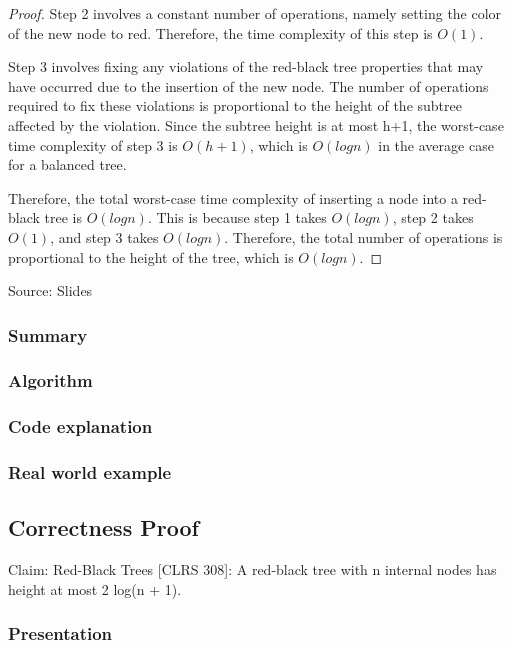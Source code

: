 \documentclass[10pt]{article}
\begin{document}
\begin{proof}
  \spacing
  \noindent
  Step 2 involves a constant number of operations, namely setting the color of
  the new node to red. Therefore, the time complexity of this step is $O(1)$.

  \spacing
  \noindent
  Step 3 involves fixing any violations of the red-black tree properties that
  may have occurred due to the insertion of the new node. The number of
  operations required to fix these violations is proportional to the height of
  the subtree affected by the violation. Since the subtree height is at most
  h+1, the worst-case time complexity of step 3 is $O(h+1)$, which is $O(log n)$
  in the average case for a balanced tree.

  \spacing
  \noindent
  Therefore, the total worst-case time complexity of inserting a node into a
  red-black tree is $O(log n)$. This is because step 1 takes $O(log n)$, step 2
  takes $O(1)$, and step 3 takes $O(log n)$. Therefore, the total number of operations
  is proportional to the height of the tree, which is $O(log n)$.
\end{proof}

\noindent
Source: Slides

\subsubsection*{Summary}

\subsubsection*{Algorithm}

\subsubsection*{Code explanation}

\subsubsection*{Real world example}

\subsection*{Correctness Proof}

Claim: Red-Black Trees [CLRS 308]: A red-black tree with n internal nodes has height at most
2 log(n + 1).

\subsubsection*{Presentation}
\end{document}
